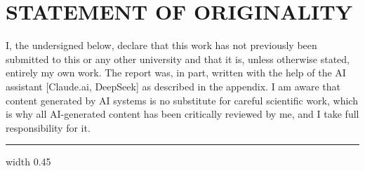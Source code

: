 \documentclass[../report.tex]{subfiles}
\begin{document}
    \section*{STATEMENT OF ORIGINALITY}

    \noindent I, the undersigned below, declare that this work has not previously been submitted to this or any other university and that it is, unless otherwise stated, entirely my own work. The report was, in part, written with the help of the AI assistant [Claude.ai, DeepSeek] as described in the appendix. I am aware that content generated by AI systems is no substitute for careful scientific work, which is why all AI-generated content has been critically reviewed by me, and I take full responsibility for it.

    \vspace{1cm}

    \hrule width 0.45\linewidth
    \hfill \hspace{0.025\linewidth}
    \hrulefill

\end{document}
